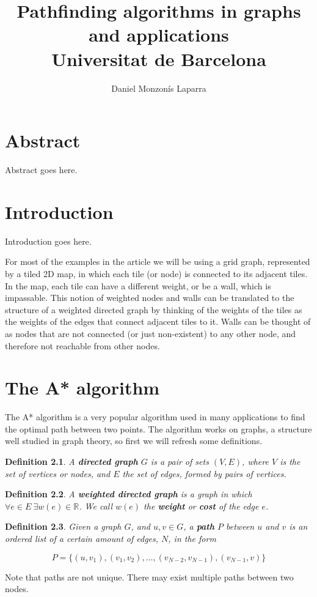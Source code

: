 \documentclass[12pt]{report}
\title{
{Pathfinding algorithms in graphs and applications}\\
{\large Universitat de Barcelona}
}
\author{Daniel Monzonís Laparra}
\newtheorem{mydef}{Definition}
\begin{document}
\maketitle

\chapter*{Abstract}
Abstract goes here.

\tableofcontents

\chapter{Introduction}
Introduction goes here.

For most of the examples in the article we will be using a grid graph, represented by a tiled 2D map, in which each tile (or node) is connected to its adjacent tiles. In the map, each tile can have a different weight, or be a wall, which is impassable. This notion of weighted nodes and walls can be translated to the structure of a weighted directed graph by thinking of the weights of the tiles as the weights of the edges that connect adjacent tiles to it. Walls can be thought of as nodes that are not connected (or just non-existent) to any other node, and therefore not reachable from other nodes.

\chapter{The A* algorithm}
The A* algorithm is a very popular algorithm used in many applications to find the optimal path between two points. The algorithm works on graphs, a structure well studied in graph theory, so first we will refresh some definitions.

\begin{mydef}
A \textbf{directed graph} $G$ is a pair of sets $(V, E)$, where $V$ is the set of vertices or nodes, and $E$ the set of edges, formed by pairs of vertices.
\end{mydef}

\begin{mydef}
A \textbf{weighted directed graph} is a graph in which $\forall e \in E \ \exists w(e) \in \mathbb{R}$. We call $w(e)$ the \textbf{weight} or \textbf{cost} of the edge $e$.
\end{mydef}

\begin{mydef}
Given a graph $G$, and $u, v \in G$, a \textbf{path} $P$ between $u$ and $v$ is an ordered list of a certain amount of edges, $N$, in the form

\[ P = \{(u,v_1), (v_1, v_2), \dots, (v_{N-2}, v_{N-1}), (v_{N-1}, v)\} \]

\end{mydef}
Note that paths are not unique. There may exist multiple paths between two nodes.
\end{document}
